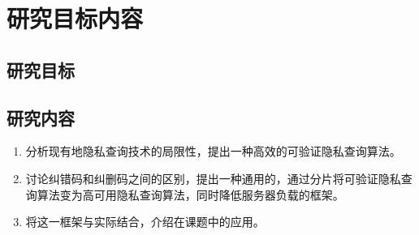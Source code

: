 \section{研究目标内容}

\subsection{研究目标}

\subsection{研究内容}
\begin{enumerate}
    \item 分析现有地隐私查询技术的局限性，提出一种高效的可验证隐私查询算法。
    \item 讨论纠错码和纠删码之间的区别，提出一种通用的，通过分片将可验证隐私查询算法变为高可用隐私查询算法，同时降低服务器负载的框架。
    \item 将这一框架与实际结合，介绍在课题中的应用。
\end{enumerate}
